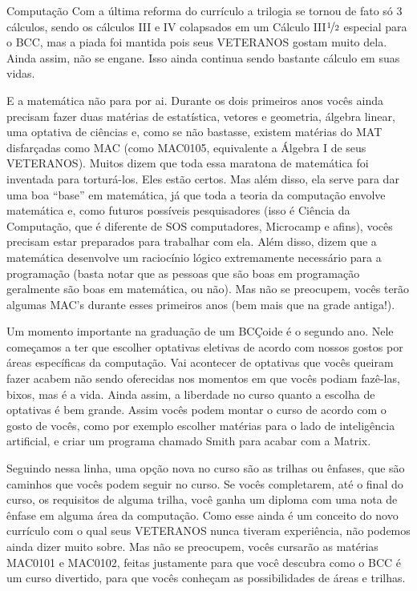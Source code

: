 \begin{subsecao}{Computação}
Com a última reforma do currículo a trilogia se tornou de fato só 3 cálculos,
sendo os cálculos III e IV colapsados em um Cálculo III$\nicefrac{1}{2}$
especial para o BCC, mas a piada foi mantida pois seus VETERANOS gostam muito
dela. Ainda assim, não se engane. Isso ainda continua sendo bastante cálculo em
suas vidas.

E a matemática não para por ai. Durante os dois primeiros anos vocês ainda
precisam fazer duas matérias de estatística, vetores e geometria, álgebra
linear, uma optativa de ciências e, como se não bastasse, existem matérias do
MAT disfarçadas como MAC (como MAC0105, equivalente a Álgebra I de seus
VETERANOS). Muitos dizem que toda essa maratona de matemática foi inventada para
torturá-los. Eles estão certos. Mas além disso, ela serve para dar uma boa
``base'' em matemática, já que toda a teoria da computação envolve matemática
e, como futuros possíveis pesquisadores (isso é Ciência da Computação, que é
diferente de SOS computadores, Microcamp e afins), vocês precisam estar
preparados para trabalhar com ela. Além disso, dizem que a matemática
desenvolve um raciocínio lógico extremamente necessário para a programação
(basta notar que as pessoas que são boas em programação geralmente são boas em
matemática, ou não). Mas não se preocupem, vocês terão algumas MAC's durante
esses primeiros anos (bem mais que na grade antiga!).

Um momento importante na graduação de um BCÇoide é o segundo ano. Nele começamos
a ter que escolher optativas eletivas de acordo com nossos gostos por áreas
específicas da computação. Vai acontecer de optativas que vocês queiram fazer
acabem não sendo oferecidas nos momentos em que vocês podiam fazê-las, bixos,
mas é a vida. Ainda assim, a liberdade no curso quanto a escolha de optativas é
bem grande. Assim vocês podem montar o curso de acordo com o gosto de vocês,
como por exemplo escolher matérias para o lado de inteligência artificial, e
criar um programa chamado Smith para acabar com a Matrix.

Seguindo nessa linha, uma opção nova no curso são as trilhas ou ênfases, que
são caminhos que vocês podem seguir no curso. Se vocês completarem, até o final
do curso, os requisitos de alguma trilha, você ganha um diploma com uma nota de
ênfase em alguma área da computação. Como esse ainda é um conceito do novo
currículo com o qual seus VETERANOS nunca tiveram experiência, não podemos
ainda dizer muito sobre. Mas não se preocupem, vocês cursarão as matérias
MAC0101 e MAC0102, feitas justamente para que você descubra como o BCC é um
curso divertido, para que vocês conheçam as possibilidades de áreas e trilhas.


\end{subsecao}

